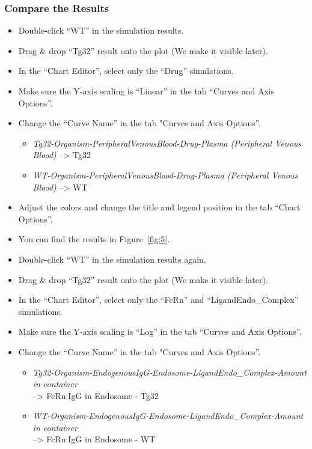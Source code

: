 \documentclass[fleqn,10pt]{physiome}
\begin{document}
\subsubsection{Compare the Results}
\begin{itemize}
    \item Double-click ``WT'' in the simulation results.
    \item Drag \& drop ``Tg32'' result onto the plot (We make it visible later).
    \item In the ``Chart Editor'', select only the ``Drug'' simulations.
    \item Make sure the Y-axis scaling is ``Linear'' in the tab ``Curves and Axis Options''.
    \item Change the ``Curve Name'' in the tab "Curves and Axis Options''.
    \begin{itemize}
        \item \textit{Tg32-Organism-PeripheralVenousBlood-Drug-Plasma (Peripheral Venous Blood)} --> Tg32
        \item \textit{WT-Organism-PeripheralVenousBlood-Drug-Plasma (Peripheral Venous Blood)} --> WT
    \end{itemize}
    \item Adjust the colors and change the title and legend position in the tab ``Chart Options''.
    \item You can find the results in Figure~\ref{fig:5}.
    \item Double-click ``WT'' in the simulation results again.
    \item Drag \& drop ``Tg32'' result onto the plot (We make it visible later).
    \item In the ``Chart Editor'', select only the ``FcRn'' and ``LigandEndo\_Complex'' simulations.
    \item Make sure the Y-axis scaling is ``Log'' in the tab ``Curves and Axis Options''.
    \item Change the ``Curve Name'' in the tab "Curves and Axis Options''.
    \begin{itemize}
        \item \textit{Tg32-Organism-EndogenousIgG-Endosome-LigandEndo\_Complex-Amount in container} 
        \\--> FcRn:IgG in Endosome - Tg32
        \item \textit{WT-Organism-EndogenousIgG-Endosome-LigandEndo\_Complex-Amount in container} 
        \\--> FcRn:IgG in Endosome - WT

\end{itemize}
\end{itemize}
\end{document}
